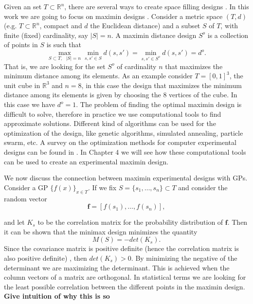 \documentclass[12pt]{book}
\begin{document}
Given an set $T\subset\mathbb{R}^{n}$, there are several ways to create space filling designs 
\cite{pronzato2012design}. In this work we are going to focus on maximin designs
\cite{johnson1990minimax}. Consider a metric space $(T,d)$ (e.g.
$T\subset\mathbb{R}^{n}$, compact and $d$ the Euclidean distance) and a subset $S$ of $T$, 
with finite (fixed) cardinality, say $|S|=n$.
A maximin distance design $S^{o}$ is a collection of points in $S$ is such that
\begin{equation*}
\max_{S\subset T,\text{ }|S|=n}\min_{s,s'\in S}d(s,s')=\min_{s,s'\in S^{o}}d(s,s')=d^{o}.
\end{equation*}
That is, we are looking for the set $S^{o}$ of cardinality $n$ that maximizes the minimum distance among 
its elements. As an example consider $T=[0,1]^{3}$, the unit cube in $\mathbb{R}^{3}$ and $n=8$, in 
this case the design that maximizes the minimum distance among its elements is given by choosing
 the 8 vertices of the cube. In this case we have $d^{o}=1$. The problem of finding
the optimal  maximin design is difficult to solve, therefore in practice we use computational tools
to find approximate solutions.  Different kind of algorithms can be used for the optimization
of the design, like genetic algorithms, simulated annealing, particle swarm, etc. A survey
on the optimization methods for computer experimental designs  can be found in 
\cite{viana2010algorithm}. In Chapter 4 we will see how  these computational tools can be used to 
create an experimental maximin design.

We now discuss the connection between maximin experimental designs with GPs. Consider a
GP $\{f(x)\}_{x\in T}$. If we fix $S=\{s_{1},\ldots,s_{n}\}\subset T$  and consider the random vector
\begin{equation*}
\textbf{f}=[f(s_{1}),\ldots,f(s_{n})],
\end{equation*}



and let $K_{s}$ to be 
the correlation matrix for the probability distribution of $\textbf{f}$. Then it can be shown
that the minimax design minimizes the quantity \cite{johnson1990minimax}
\begin{equation*}
M(S)=-det(K_{s}).
\end{equation*}
Since the covariance matrix is positive definite (hence the correlation matrix is also positive definite)
, then $det(K_{s})>0$. By minimizing the  negative of the determinant  we are maximizing
 the determinant. This is achieved when the column vectors of a matrix
are orthogonal. In statistical terms  we are looking for  
the least possible correlation between the different points in the maximin design. \textbf{Give intuition
of why this is so} 
\newline
\end{document}
